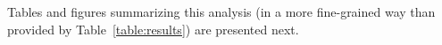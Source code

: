 Tables and figures summarizing this analysis (in a more fine-grained way than provided by Table~\ref{table:results}) are presented next.


